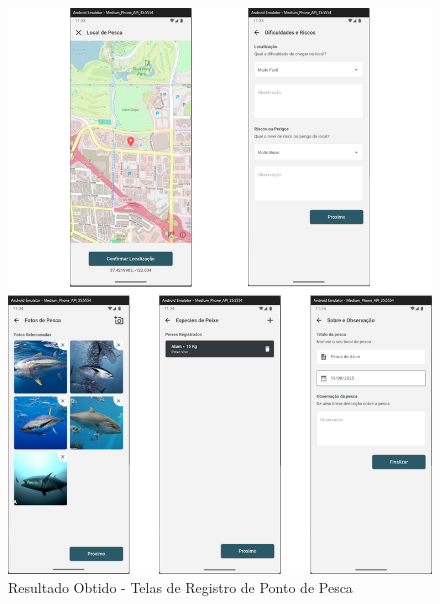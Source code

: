 \begin{figure}[H]
    \centering
    \caption{Resultado Obtido - Telas de Registro de Ponto de Pesca}
    \label{fig:emultatorSpotRegisterLightPages}
    \includegraphics[scale=0.35]{./dados/figuras/emulator-spot-register-light-pages.png}
\end{figure}